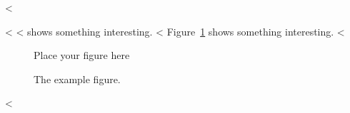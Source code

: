 <%

<%
<%
 shows something interesting.
<%
Figure~\ref{fig:label} shows something interesting.
<%

\begin{figure}
  \centering
  Place your figure here
  \caption{The example figure.}
  \label{fig:label}
\end{figure}
<%
